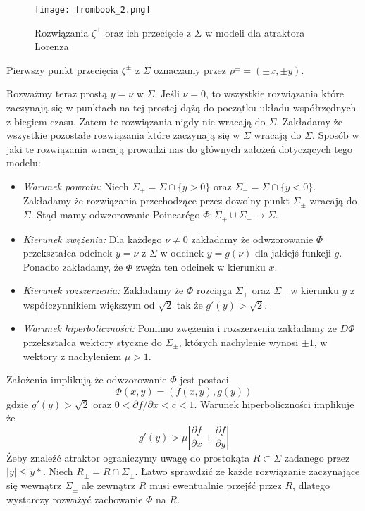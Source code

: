 \documentclass[12pt]{report}
\begin{document}
	\begin{figure}[H]
		\centering
		\texttt{[image: frombook\_2.png]}
		\caption{Rozwiązania $\zeta^{\pm}$ oraz ich przecięcie z $\Sigma$ w modeli dla atraktora Lorenza \cite{HSD}}
		\label{fig:frombook_2}
	\end{figure}
	Pierwszy punkt przecięcia $\zeta^{\pm}$ z $\Sigma$ oznaczamy przez $\rho^{\pm} = (\pm x, \pm y)$.
	\par Rozważmy teraz prostą $y = \nu$ w $\Sigma$. Jeśli $\nu = 0$, to wszystkie rozwiązania które zaczynają się w punktach na tej prostej dążą do początku układu współrzędnych z biegiem czasu. Zatem te rozwiązania nigdy nie wracają do $\Sigma$. Zakładamy że wszystkie pozostałe rozwiązania które zaczynają się w $\Sigma$ wracają do $\Sigma$. Sposób w jaki te rozwiązania wracają prowadzi nas do głównych założeń dotyczących tego modelu:
	\begin{itemize}
		\item \textit{Warunek powrotu:} Niech $\Sigma_+ = \Sigma \cap \{y > 0\}$ oraz $\Sigma_- = \Sigma \cap \{y < 0\}$. Zakładamy że rozwiązania przechodzące przez dowolny punkt $\Sigma_{\pm}$ wracają do $\Sigma$. Stąd mamy odwzorowanie Poincarégo $\Phi: \Sigma_+ \cup \Sigma_- \to \Sigma$.
		\item \textit{Kierunek zwężenia:} Dla każdego $\nu \ne 0$ zakładamy że odwzorowanie $\Phi$ przekształca odcinek $y = \nu$ z $\Sigma$ w odcinek $y = g(\nu)$ dla jakiejś funkcji $g$. Ponadto zakładamy, że $\Phi$ zwęża ten odcinek w kierunku $x$.
		\item \textit{Kierunek rozszerzenia:} Zakładamy że $\Phi$ rozciąga $\Sigma_+$ oraz $\Sigma_-$ w kierunku $y$ z współczynnikiem większym od $\sqrt{2}$ tak że $g'(y) > \sqrt{2}$.
		\item \textit{Warunek hiperboliczności:} Pomimo zwężenia i rozszerzenia zakładamy że $D\Phi$ przekształca wektory styczne do $\Sigma_{\pm}$, których nachylenie wynosi $\pm 1$, w wektory z nachyleniem $\mu > 1$.
	\end{itemize}
	\par Założenia implikują że odwzorowanie $\Phi$ jest postaci
		\[ \Phi(x, y) = (f(x, y), g(y)) \]
	gdzie $g'(y) > \sqrt{2}$ oraz $0 < {\partial f}/{\partial x} < c < 1$. Warunek hiperboliczności implikuje że
		\[ g'(y) > \mu \left| \frac{\partial f}{\partial x} \pm \frac{\partial f}{\partial y} \right| \]
	Żeby znaleźć atraktor ograniczymy uwagę do prostokąta $R \subset \Sigma$ zadanego przez $\lvert y \rvert \le y*$. Niech $R_{\pm} = R \cap \Sigma_{\pm}$. Łatwo sprawdzić że każde rozwiązanie zaczynające się wewnątrz $\Sigma_{\pm}$ ale zewnątrz $R$ musi ewentualnie przejść przez $R$, dlatego wystarczy rozważyć zachowanie $\Phi$ na $R$.
\end{document}
